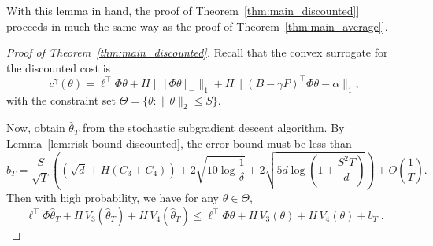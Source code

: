\documentclass[11pt]{article}
\begin{document}
With this lemma in hand, the proof of Theorem~\ref{thm:main_discounted}] proceeds in much the same way as the proof of Theorem~\ref{thm:main_average}].
\begin{proof}[Proof of Theorem~\ref{thm:main_discounted}]
Recall that the convex surrogate for the discounted cost is
\begin{equation*}
  c^\gamma(\theta)= \ell^\top \Phi \theta  + H \|\left[\Phi \theta \right]_{-}\|_1 + H  \|(B-\gamma P)^\top \Phi \theta -\alpha \|_1,
\end{equation*}
with the constraint set $\Theta=\{\theta: \|\theta\|_2 \leq S\}$.

Now, obtain $\widehat\theta_T$ from the stochastic subgradient descent algorithm.  By Lemma~\ref{lem:risk-bound-discounted}, the error bound must be less than
\begin{equation*}
  b_T
  =
  \frac{S}{\sqrt{T}}
  \left((\sqrt{d} + H (C_3 + C_4))
  + 2\sqrt{10 \log\frac{1}{\delta}}
  +2\sqrt{5d \log \left( 1 + \frac{S^2 T}{d} \right)} \right)
  + O\left(\frac{1}{T}\right).
\end{equation*}
Then with high probability, we have for any $\theta \in \Theta$,
\begin{equation*}
\label{eq:online-to-batch2}
\ell^\top \Phi \widehat \theta_T + H\, V_3(\widehat\theta_T) + H\, V_4(\widehat\theta_T) \le \ell^\top\Phi\theta+ H\, V_3(\theta)  + H\, V_4(\theta) + b_T\; .
\end{equation*}


\end{proof}
\end{document}
